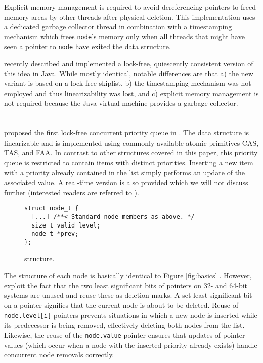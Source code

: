 Explicit memory management is required to avoid dereferencing pointers to freed memory areas
by other threads after physical deletion. This implementation uses a dedicated garbage collector
thread in combination with a timestamping mechanism which frees \lstinline|node|'s memory only
when all threads that might have seen a pointer to \lstinline|node| have exited the data structure.

\citeauthor{herlihy2012art} \cite{herlihy2012art} recently described and implemented a lock-free,
quiescently consistent version of this idea in Java. While mostly identical, notable differences are
that a) the new variant is based on a lock-free skiplist, b) the timestamping mechanism was not
employed and thus linearizability was lost, and c) explicit memory management is not required
because the Java virtual machine provides a garbage collector.

\section{\citeauthor{sundell2003fast}} \label{sec:sundell}

\citeauthor{sundell2003fast} proposed the first lock-free concurrent priority queue in
\citeyear{sundell2003fast} \cite{sundell2003fast}. The data structure is linearizable
and is implemented using commonly available atomic primitives \ac{CAS}, \ac{TAS}, and \ac{FAA}.
In contrast to other structures covered in this paper, this priority queue is restricted to
contain items with distinct priorities. Inserting a new item with a priority already contained
in the list simply performs an update of the associated value.
A real-time version is also provided which we will not discuss further (interested readers are
referred to \cite{sundell2003fast}).

\begin{figure}[ht]
\begin{lstlisting}
struct node_t {
  [...] /**< Standard node members as above. */
  size_t valid_level;
  node_t *prev;
};
\end{lstlisting}
\caption{\citeauthor{sundell2003fast} structure.}
\label{fig:sundellsl}
\end{figure}

The structure of each node is basically identical to Figure \ref{fig:basicsl}. However, \citeauthor{sundell2003fast}
exploit the fact that the two least significant bits of pointers on 32- and 64-bit systems
are unused and reuse these as deletion marks. A set least significant bit on a pointer signifies
that the current node is about to be deleted.
Reuse of \lstinline|node.level[i]| pointers
prevents situations in which a new node is inserted while its predecessor is being removed,
effectively deleting both nodes from the list. Likewise, the reuse of the \lstinline|node.value|
pointer ensures that updates of pointer values (which occur when a node with the inserted priority already exists)
handle concurrent node removals correctly.

